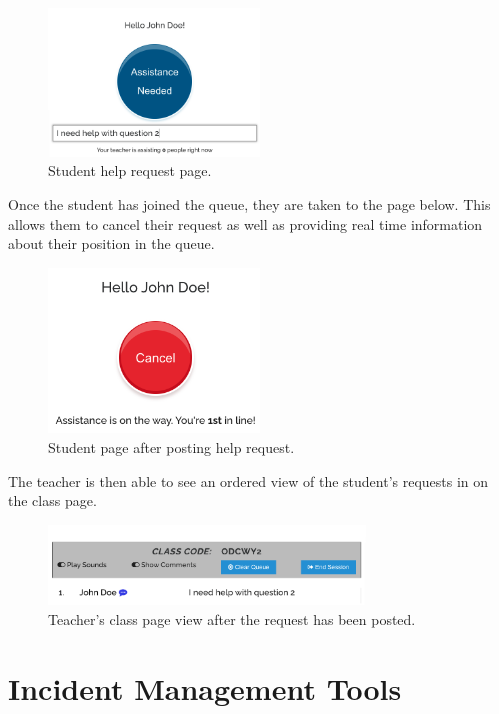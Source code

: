 \FloatBarrier
\begin{figure}[H]
  \centering
  \includegraphics[width=0.5\textwidth]{2context/images/cq4.png}
  \caption{Student help request page.}
\end{figure}

Once the student has joined the queue, they are taken to the page below. This allows them to cancel their request as well as providing real time information about their position in the queue.

\FloatBarrier
\begin{figure}[H]
  \centering
  \includegraphics[width=0.5\textwidth]{2context/images/cq5.png}
  \caption{Student page after posting help request.}
\end{figure}

The teacher is then able to see an ordered view of the student's requests in on the class page.

\FloatBarrier
\begin{figure}[H]
  \centering
  \includegraphics[width=0.75\textwidth]{2context/images/cq6.png}
  \caption{Teacher's class page view after the request has been posted.}
\end{figure}

\newpage
\section{Incident Management Tools}

